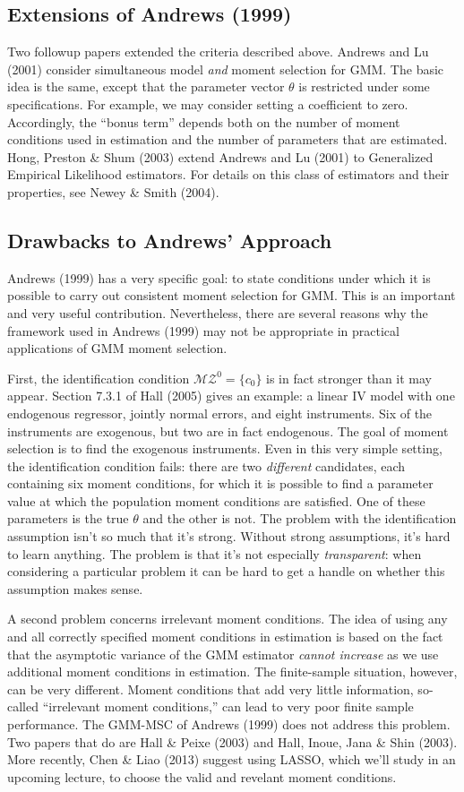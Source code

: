 \documentclass[12pt]{article}
\theoremstyle{definition}
\begin{document}
\subsection{Extensions of Andrews (1999)}
Two followup papers extended the criteria described above. Andrews and Lu (2001) consider simultaneous model \emph{and} moment selection for GMM. The basic idea is the same, except that the parameter vector $\theta$ is restricted under some specifications. For example, we may consider setting a coefficient to zero. Accordingly, the ``bonus term'' depends both on the number of moment conditions used in estimation and the number of parameters that are estimated. Hong, Preston \& Shum (2003) extend Andrews and Lu (2001) to Generalized Empirical Likelihood estimators. For details on this class of estimators and their properties, see Newey \& Smith (2004). 

\subsection{Drawbacks to Andrews' Approach}
Andrews (1999) has a very specific goal: to state conditions under which it is possible to carry out consistent moment selection for GMM. This is an important and very useful contribution. Nevertheless, there are several reasons why the framework used in Andrews (1999) may not be appropriate in practical applications of GMM moment selection. 

First, the identification condition $\mathcal{MZ}^0 = \{c_0\}$ is in fact stronger than it may appear. Section 7.3.1 of Hall (2005) gives an example: a linear IV model with one endogenous regressor, jointly normal errors, and eight instruments. Six of the instruments are exogenous, but two are in fact endogenous. The goal of moment selection is to find the exogenous instruments. Even in this very simple setting, the identification condition fails: there are two \emph{different} candidates, each containing six moment conditions, for which it is possible to find a parameter value at which the population moment conditions are satisfied. One of these parameters is the true $\theta$ and the other is not. The problem with the identification assumption isn't so much that it's strong. Without strong assumptions, it's hard to learn anything. The problem is that it's not especially \emph{transparent}: when considering a particular problem it can be hard to get a handle on whether this assumption makes sense.  


A second problem concerns irrelevant moment conditions. The idea of using any and all correctly specified moment conditions in estimation is based on the fact that the asymptotic variance of the GMM estimator \emph{cannot increase} as we use additional moment conditions in estimation. The finite-sample situation, however, can be very different. Moment conditions that add very little information, so-called ``irrelevant moment conditions,'' can lead to very poor finite sample performance. The GMM-MSC of Andrews (1999) does not address this problem. Two papers that do are Hall \& Peixe (2003) and Hall, Inoue, Jana \& Shin (2003). More recently, Chen \& Liao (2013) suggest using LASSO, which we'll study in an upcoming lecture, to choose the valid and revelant moment conditions.
\end{document}
